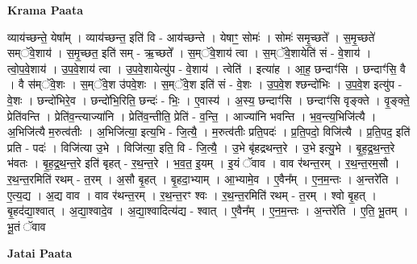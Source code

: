 \documentclass[17pt]{extarticle}
\begin{document}
\textbf{Krama Paata} \newline

व्याय॑च्छन्ते॒ येषा᳚म् । व्याय॑च्छन्त॒ इति॑ वि - आय॑च्छन्ते । येषाꣳ॒॒ सोमः॑ । सोमः॑ समृ॒च्छते᳚ । स॒मृ॒च्छते॑ सम्ॅवे॒शाय॑ । स॒मृ॒च्छत॒ इति॑ सम् - ऋ॒च्छते᳚ । स॒म्ॅवे॒शाय॑ त्वा । स॒म्ॅवे॒शायेति॑ सं - वे॒शाय॑ । त्वो॒प॒वे॒शाय॑ । उ॒प॒वे॒शाय॑ त्वा । उ॒प॒वे॒शायेत्यु॑प - वे॒शाय॑ । त्वेति॑ । इत्या॑ह । आ॒ह॒ छन्दाꣳ॑सि । छन्दाꣳ॑सि॒ वै । वै स॑म्ॅवे॒शः । स॒म्ॅवे॒श उ॑पवे॒शः । स॒म्ॅवे॒श इति॑ सं - वे॒शः । उ॒प॒वे॒श श्छन्दो॑भिः । उ॒प॒वे॒श इत्यु॑प - वे॒शः । छन्दो॑भिरे॒व । छन्दो॑भि॒रिति॒ छन्दः॑ - भिः॒ । ए॒वास्य॑ । अ॒स्य॒ छन्दाꣳ॑सि । छन्दाꣳ॑सि वृङ्क्ते । वृ॒ङ्क्ते॒ प्रेति॑वन्ति । प्रेति॑व॒न्त्याज्या॑नि । प्रेति॑व॒न्तीति॒ प्रेति॑ - व॒न्ति॒ । आज्या॑नि भवन्ति । भ॒व॒न्त्य॒भिजि॑त्यै । अ॒भिजि॑त्यै म॒रुत्व॑तीः । अ॒भिजि॑त्या॒ इत्य॒भि - जि॒त्यै॒ । म॒रुत्व॑तीः प्रति॒पदः॑ । प्र॒ति॒पदो॒ विजि॑त्यै । प्र॒ति॒पद॒ इति॑ प्रति - पदः॑ । विजि॑त्या उ॒भे । विजि॑त्या॒ इति॒ वि - जि॒त्यै॒ । उ॒भे बृ॑हद्रथन्त॒रे । उ॒भे इत्यु॒भे । बृ॒ह॒द्र॒थ॒न्त॒रे भ॑वतः । बृ॒ह॒द्र॒थ॒न्त॒रे इति॑ बृहत् - र॒थ॒न्त॒रे । भ॒व॒त॒ इ॒यम् । इ॒यं ॅवाव । वाव र॑थन्त॒रम् । र॒थ॒न्त॒रम॒सौ । र॒थ॒न्त॒रमिति॑ रथम् - त॒रम् । अ॒सौ बृ॒हत् । बृ॒हदा॒भ्याम् । आ॒भ्यामे॒व । ए॒वैन᳚म् । ए॒न॒म॒न्तः । अ॒न्तरे॑ति । ए॒त्य॒द्य । अ॒द्य वाव । वाव र॑थन्त॒रम् । र॒थ॒न्त॒रꣳ श्वः । र॒थ॒न्त॒रमिति॑ रथम् - त॒रम् । श्वो बृ॒हत् । बृ॒हद॑द्या॒श्वात् । अ॒द्या॒श्वादे॒व । अ॒द्या॒श्वादित्य॑द्य - श्वात् । ए॒वैन᳚म् । ए॒न॒म॒न्तः । अ॒न्तरे॑ति । ए॒ति॒ भू॒तम् । भू॒तं ॅवाव \newline

\textbf{Jatai Paata} \newline
\end{document}
